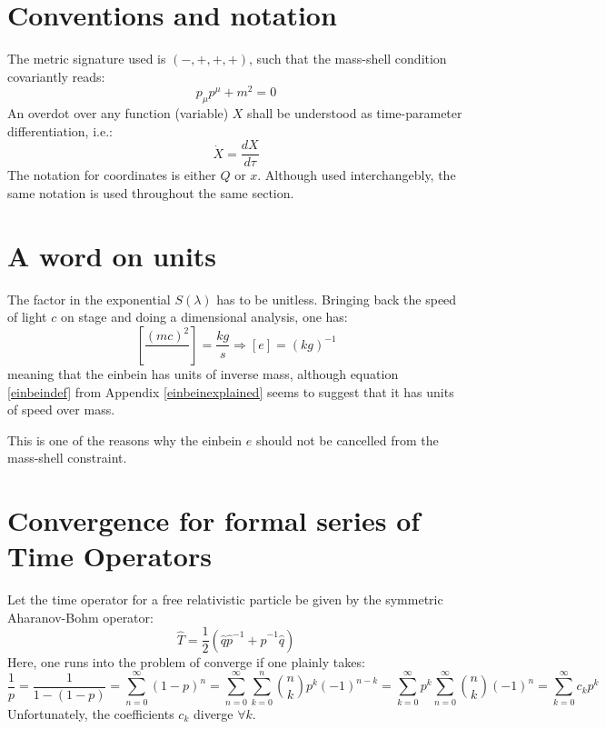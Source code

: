 \documentclass[twoside,a4paper,11pt]{article}
\numberwithin{equation}{section}
\begin{document}
\iffalse
\begin{appendices}




\section{Conventions and notation}
The metric signature used is $(-,+,+,+)$, such that the mass-shell condition covariantly reads:
\begin{equation}
p_\mu p^\mu + m^2 = 0
\end{equation}
An overdot over any function (variable) $X$ shall be understood as time-parameter differentiation, i.e.:
\begin{equation}
\dot{X} = \dfrac{d X}{d \tau}
\end{equation}
The notation for coordinates is either $Q$ or $x$. Although used interchangebly, the same notation is used throughout the same section.


\section{A word on units}
The factor in the exponential $ S(\lambda)$ has to be unitless. Bringing back the speed of light $c$ on stage and doing a dimensional analysis, one has:
\begin{equation}
   \left[ \frac{(mc)^2}{ }\right] =  \frac{kg}{s} \Rightarrow \left[e\right] = (kg)^{-1}
\end{equation} 
meaning that the einbein has units of inverse mass, although equation \ref{einbeindef} from Appendix \ref{einbeinexplained} seems to suggest that it has units of speed over mass. 

This is one of the reasons why the einbein $e$ should not be cancelled from the mass-shell constraint.


\section{Convergence for formal series of Time Operators}
\label{timeoperatorconvproblems}
Let the time operator for a free relativistic particle be given by the symmetric Aharanov-Bohm operator:
\begin{equation}
    \hat{T} = \frac{1}{2}\left( \hat{q}\hat{p}^{-1} + \hat{p}^{-1}\hat{q}\right)
\end{equation}
Here, one runs into the problem of converge if one plainly takes:
\begin{equation}
    \frac{1}{p} = \frac{1}{1 - (1 - p)} = \sum_{n=0}^{\infty} (1-p)^n = \sum_{n=0}^{\infty} \sum_{k=0}^n {n \choose k} p^k (-1)^{n-k} = \sum_{k=0}^{\infty} p^k \sum_{n=0}^{\infty} { n \choose k}  (-1)^{n} = \sum_{k=0}^{\infty} c_k p^k
\end{equation}
Unfortunately, the coefficients $c_k$ diverge $\forall k$.



\end{appendices}
\end{document}

